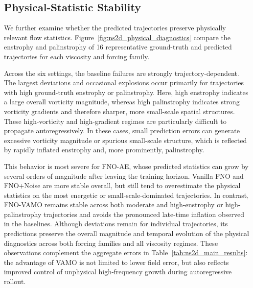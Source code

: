 \documentclass[11pt]{article}
\begin{document}
\subsection{Physical-Statistic Stability}
\label{sec:physical_diagnostics}

We further examine whether the predicted trajectories preserve physically relevant flow statistics. Figure~\ref{fig:ns2d_physical_diagnostics} compare the enstrophy and palinstrophy of 16 representative ground-truth and predicted trajectories for each viscosity and forcing family. 

Across the six settings, the baseline failures are strongly trajectory-dependent. The largest deviations and occasional explosions occur primarily for trajectories with high ground-truth enstrophy or palinstrophy. Here, high enstrophy indicates a large overall vorticity magnitude, whereas high palinstrophy indicates strong vorticity gradients and therefore sharper, more small-scale spatial structures. These high-vorticity and high-gradient regimes are particularly difficult to propagate autoregressively. In these cases, small prediction errors can generate excessive vorticity magnitude or spurious small-scale structure, which is reflected by rapidly inflated enstrophy and, more prominently, palinstrophy.

This behavior is most severe for FNO-AE, whose predicted statistics can grow by several orders of magnitude after leaving the training horizon. Vanilla FNO and FNO+Noise are more stable overall, but still tend to overestimate the physical statistics on the most energetic or small-scale-dominated trajectories. In contrast, FNO-VAMO remains stable across both moderate and high-enstrophy or high-palinstrophy trajectories and avoids the pronounced late-time inflation observed in the baselines. Although deviations remain for individual trajectories, its predictions preserve the overall magnitude and temporal evolution of the physical diagnostics across both forcing families and all viscosity regimes. These observations complement the aggregate errors in Table~\ref{tab:ns2d_main_results}: the advantage of VAMO is not limited to lower field error, but also reflects improved control of unphysical high-frequency growth during autoregressive rollout.
\end{document}
